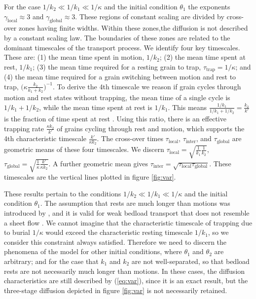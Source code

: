 \documentclass[]{agujournal2018}
\begin{document}
For the case $1/k_2 \ll 1/k_1 \ll 1/\kappa$ and the initial condition $\theta_1$ the exponents $\gamma_\text{local} \approx 3$ and $\gamma_\text{global} \approx 3$.
These regions of constant scaling are divided by cross-over zones having finite widths.
Within these zones,the diffusion is not described by a constant scaling law.
The boundaries of these zones are related to the dominant timescales of the transport process.
We identify four key timescales.
These are: (1) the mean time spent in motion, $1/k_2$; (2) the mean time spent at rest, $1/k_1$; (3) the mean time required for a resting grain to trap, $\tau_\text{trap}=1/\kappa$; and (4) the mean time required for a grain switching between motion and rest to trap, $\big(\kappa \frac{k_2}{k_1+k_2}\big)^{-1}$.
To derive the 4th timescale we reason if grain cycles through motion and rest states without trapping, the mean time of a single cycle is $1/k_1 + 1/k_2$, while the mean time spent at rest is $1/k_1$. This means $\frac{1/k_1}{1/k_1 + 1/k_2} = \frac{k_2}{k'}$ is the fraction of time spent at rest \citep[c.f.][]{Ancey2006}. Using this ratio, there is an effective trapping rate $\frac{\kappa k_2}{k'}$ of grains cycling through rest and motion, which supports the 4th characteristic timescale $\frac{k'}{\kappa k_2}$.
The cross-over times $\tau_\text{local}$, $\tau_\text{inter}$, and $\tau_\text{global}$ are geometric means of these four timescales.
We discern $\tau_\text{local} = \sqrt{\frac{1}{k_1}\frac{1}{k_2}}$, $\tau_\text{global} = \sqrt{\frac{1}{\kappa} \frac{k'}{\kappa k_2}}$.
A further geometric mean gives $\tau_\text{inter} = \sqrt{\tau_\text{local}\tau_\text{global}}$.
These timescales are the vertical lines plotted in figure \ref{fig:var}.

These results pertain to the conditions $1/k_2 \ll 1/k_1 \ll 1/\kappa$ and the initial condition $\theta_1$.
The assumption that rests are much longer than motions was introduced by \citet{Einstein1937}, and it is valid for weak bedload transport that does not resemble a sheet flow \citep{Frey2014}.
We cannot imagine that the characteristic timescale of trapping due to burial $1/\kappa$ would exceed the characteristic resting timescale $1/k_1$, so we consider this constraint always satisfied.
Therefore we need to discern the phenomena of the model for other initial conditions, where $\theta_1 $ and $\theta_2$ are arbitrary; and for the case that $k_1$ and $k_2$ are not well-separated, so that bedload rests are not necessarily much longer than motions.
In these cases, the diffusion characteristics are still described by (\ref{eq:var}), since it is an exact result, but the three-stage diffusion depicted in figure \ref{fig:var} is not necessarily retained.
\end{document}

